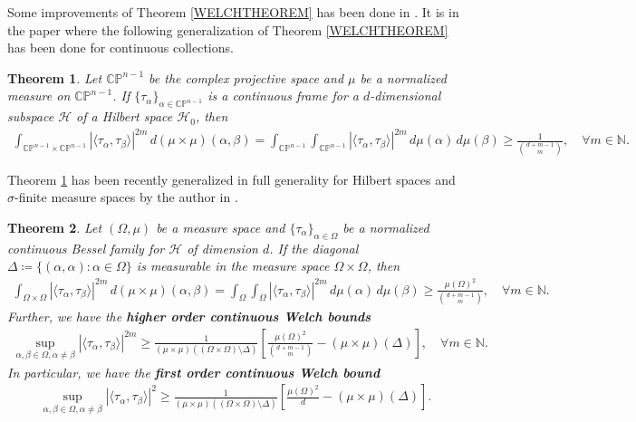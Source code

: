 \documentclass{amsart}
\newtheorem{theorem}{Theorem}[section]
\begin{document}
Some improvements of Theorem \ref{WELCHTHEOREM}  has been done in \cite{CHRISTENSENDATTAKIM, DATTAWELCHLMA, WALDRONSH, WALDRON2003}.  It is in the paper \cite{DATTAHOWARD} where the following generalization of Theorem \ref{WELCHTHEOREM} has been done for continuous collections.
 \begin{theorem}\cite{DATTAHOWARD}\label{DATTATHEOREM}
	Let $\mathbb{C}	\mathbb{P}^{n-1}$ be the complex projective space and $\mu$ be a normalized measure on $\mathbb{C}	\mathbb{P}^{n-1}$.  If $\{\tau_\alpha\}_{\alpha \in \mathbb{C}	\mathbb{P}^{n-1}}$ is a continuous frame for a $d$-dimensional subspace $\mathcal{H}$  of a Hilbert space $\mathcal{H}_0$, then 
	\begin{align*}
	\int_{\mathbb{C}	\mathbb{P}^{n-1}\times\mathbb{C}	\mathbb{P}^{n-1}}|\langle \tau_\alpha, \tau_\beta\rangle|^{2m}\, d(\mu\times\mu)(\alpha,\beta)=		\int_{\mathbb{C}	\mathbb{P}^{n-1}}\int_{\mathbb{C}	\mathbb{P}^{n-1}}|\langle \tau_\alpha, \tau_\beta\rangle|^{2m}\, d \mu(\alpha)\, d \mu(\beta)\geq \frac{1}{{d+m-1\choose m}}, \quad \forall m \in \mathbb{N}.
	\end{align*}
\end{theorem}
Theorem \ref{DATTATHEOREM} has been recently generalized in full generality for Hilbert spaces and $\sigma$-finite  measure spaces by the author in \cite{MAHESHKRISHNA}.
\begin{theorem}\cite{MAHESHKRISHNA}\label{CONTINUOUSHILBERT}
	Let $(\Omega, \mu)$ be a  measure space and $\{\tau_\alpha\}_{\alpha\in \Omega}$ be a 	normalized continuous Bessel  family for $\mathcal{H}$ of dimension $d$. If the diagonal $\Delta\coloneqq \{(\alpha, \alpha):\alpha \in \Omega\}$ is measurable in the measure space $\Omega\times \Omega$, then 
	\begin{align*}
		\int_{\Omega\times\Omega}|\langle \tau_\alpha, \tau_\beta\rangle|^{2m}\, d(\mu\times\mu)(\alpha,\beta)=	\int_{\Omega}\int_{\Omega}|\langle \tau_\alpha, \tau_\beta\rangle|^{2m}\, d \mu(\alpha)\, d \mu(\beta)\geq \frac{\mu(\Omega)^2}{{d+m-1\choose m}}, \quad \forall m \in \mathbb{N}.
	\end{align*}	
	Further, we have the \textbf{higher order continuous Welch bounds} 
	\begin{align*}
		\sup _{\alpha, \beta \in \Omega, \alpha\neq \beta}|\langle \tau_\alpha, \tau_\beta\rangle |^{2m}\geq \frac{1}{(\mu\times\mu)((\Omega\times\Omega)\setminus\Delta)}	\left[\frac{	\mu(\Omega)^2}{{d+m-1 \choose m}}-(\mu\times\mu)(\Delta)\right],  \quad \forall m \in \mathbb{N}.
	\end{align*}
In particular, we have the \textbf{first order continuous Welch bound} 
	\begin{align*}
	\sup _{\alpha, \beta \in \Omega, \alpha\neq \beta}|\langle \tau_\alpha, \tau_\beta\rangle |^{2}\geq \frac{1}{(\mu\times\mu)((\Omega\times\Omega)\setminus\Delta)}\left[\frac{\mu(\Omega)^2}{d}-(\mu\times\mu)(\Delta)\right].
\end{align*}
\end{theorem}
\end{document}
